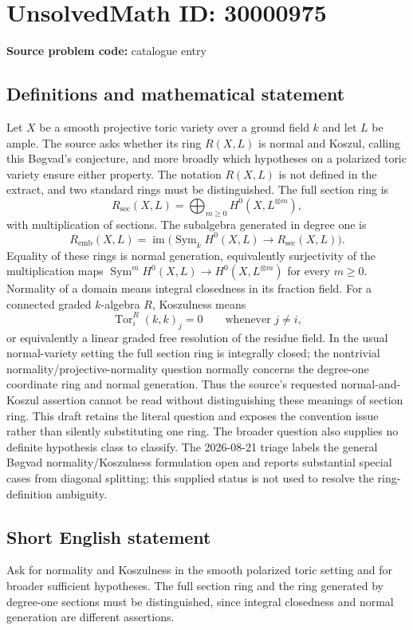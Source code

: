 \documentclass[11pt]{article}
\begin{document}
\section*{UnsolvedMath ID: 30000975}
\textbf{Source problem code:} catalogue entry
\subsection{Definitions and mathematical statement}
Let $X$ be a smooth projective toric variety over a ground field $k$ and let $L$ be ample. The source asks whether its ring $R(X,L)$ is normal and Koszul, calling this Bøgvad's conjecture, and more broadly which hypotheses on a polarized toric variety ensure either property. The notation $R(X,L)$ is not defined in the extract, and two standard rings must be distinguished. The full section ring is \[R_{\mathrm{sec}}(X,L)=\bigoplus_{m\geq0}H^0(X,L^{\otimes m}),\] with multiplication of sections. The subalgebra generated in degree one is \[R_{\mathrm{emb}}(X,L)=\operatorname{im}\bigl(\operatorname{Sym}_k H^0(X,L)\to R_{\mathrm{sec}}(X,L)\bigr).\] Equality of these rings is normal generation, equivalently surjectivity of the multiplication maps $\operatorname{Sym}^m H^0(X,L)\to H^0(X,L^{\otimes m})$ for every $m\geq0$. Normality of a domain means integral closedness in its fraction field. For a connected graded $k$-algebra $R$, Koszulness means \[\operatorname{Tor}^R_i(k,k)_j=0\qquad\text{whenever }j\ne i,\] or equivalently a linear graded free resolution of the residue field. In the usual normal-variety setting the full section ring is integrally closed; the nontrivial normality/projective-normality question normally concerns the degree-one coordinate ring and normal generation. Thus the source's requested normal-and-Koszul assertion cannot be read without distinguishing these meanings of section ring. This draft retains the literal question and exposes the convention issue rather than silently substituting one ring. The broader question also supplies no definite hypothesis class to classify. The 2026-08-21 triage labels the general Bøgvad normality/Koszulness formulation open and reports substantial special cases from diagonal splitting; this supplied status is not used to resolve the ring-definition ambiguity.
\subsection{Short English statement}
Ask for normality and Koszulness in the smooth polarized toric setting and for broader sufficient hypotheses. The full section ring and the ring generated by degree-one sections must be distinguished, since integral closedness and normal generation are different assertions.
\end{document}
